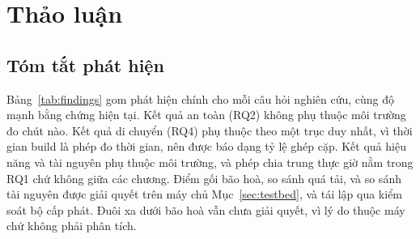 \chapter{Thảo luận\label{chapter:discussion}}

\section{Tóm tắt phát hiện}
Bảng~\ref{tab:findings} gom phát hiện chính cho mỗi câu hỏi nghiên cứu, cùng
độ mạnh bằng chứng hiện tại. Kết quả an toàn (RQ2) không phụ thuộc môi trường đo
chút nào. Kết quả di chuyển (RQ4) phụ thuộc theo một trục duy nhất, vì thời gian
build là phép đo thời gian, nên được báo dạng tỷ lệ ghép cặp. Kết quả hiệu năng và
tài nguyên phụ thuộc môi trường, và phép chia trung thực giờ nằm trong RQ1 chứ không
giữa các chương. Điểm gối bão hoà, so sánh quá tải, và
so sánh tài nguyên được giải quyết trên máy chủ Mục~\ref{sec:testbed}, và tái lập
qua kiểm soát bộ cấp phát. Đuôi xa dưới bão hoà vẫn chưa giải quyết, vì lý do
thuộc máy chứ không phải phân tích.

